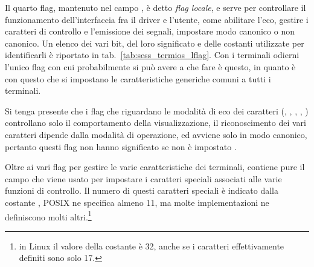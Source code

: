 Il quarto flag, mantenuto nel campo , è detto \textsl{flag
  locale}, e serve per controllare il funzionamento dell'interfaccia fra il
driver e l'utente, come abilitare l'eco, gestire i caratteri di controllo e
l'emissione dei segnali, impostare modo canonico o non canonico. Un elenco dei
vari bit, del loro significato e delle costanti utilizzate per identificarli è
riportato in tab.~\ref{tab:sess_termios_lflag}. Con i terminali odierni
l'unico flag con cui probabilmente si può avere a che fare è questo, in quanto
è con questo che si impostano le caratteristiche generiche comuni a tutti i
terminali.

Si tenga presente che i flag che riguardano le modalità di eco dei caratteri
(, , , ,
) controllano solo il comportamento della visualizzazione, il
riconoscimento dei vari caratteri dipende dalla modalità di operazione, ed
avviene solo in modo canonico, pertanto questi flag non hanno significato se
non è impostato .

Oltre ai vari flag per gestire le varie caratteristiche dei terminali,
 contiene pure il campo  che viene usato per
impostare i caratteri speciali associati alle varie funzioni di controllo. Il
numero di questi caratteri speciali è indicato dalla costante ,
POSIX ne specifica almeno 11, ma molte implementazioni ne definiscono molti
altri.\footnote{in Linux il valore della costante è 32, anche se i caratteri
  effettivamente definiti sono solo 17.}

